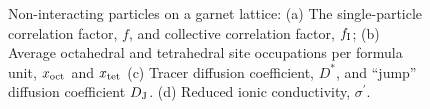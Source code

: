 \documentclass[aps,prb,twocolumn,superscriptaddress,reprint]{revtex4-1}
\begin{document}
\begin{figure}[tb]
  \centering
    \caption{\label{fig:non-interacting_data}Non-interacting particles on a garnet lattice: (a) The single-particle correlation factor, $f$, and collective correlation factor, $f_{\mathrm{I}}$; (b) Average octahedral and tetrahedral site occupations per formula unit, $x_{\mathrm{oct}}$ and $x_{\mathrm{tet}}$ (c) Tracer diffusion coefficient, $D^*$, and ``jump'' diffusion coefficient $D_{\mathrm{J}}$. (d) Reduced ionic conductivity, $\sigma^\prime$.}
\end{figure}
\end{document}
